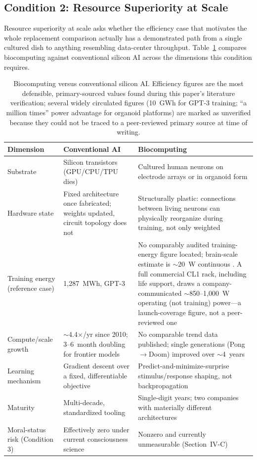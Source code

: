 \documentclass[journal]{IEEEtran}
\begin{document}
\subsection{\textcolor{ambercolor}{Condition 2: Resource Superiority at Scale}}

Resource superiority at scale asks whether the efficiency case that motivates the
whole replacement comparison actually has a demonstrated path from a single cultured
dish to anything resembling data-center throughput. Table~\ref{tab:comparison}
compares biocomputing against conventional silicon AI across the dimensions this
condition requires.

\begin{table}[!t]
\centering
\caption{Biocomputing versus conventional silicon AI. Efficiency figures are the
most defensible, primary-sourced values found during this paper's literature
verification; several widely circulated figures (10~GWh for GPT-3 training; ``a
million times'' power advantage for organoid platforms) are marked as unverified
because they could not be traced to a peer-reviewed primary source at time of
writing.}
\label{tab:comparison}
\begin{tabular}{@{}p{2.1cm}p{2.5cm}p{2.9cm}@{}}
\toprule
\textbf{Dimension} & \textbf{Conventional AI} & \textbf{Biocomputing} \\
\midrule
Substrate & Silicon transistors (GPU/CPU/TPU dies) & Cultured human neurons on
electrode arrays or in organoid form \cite{kagan2022dishbrain, jordan2024open} \\
Hardware state & Fixed architecture once fabricated; weights updated, circuit
topology does not & Structurally plastic: connections between living neurons can
physically reorganize during training, not only weighted \cite{kagan2022dishbrain} \\
Training energy (reference case) & 1{,}287~MWh, GPT-3 \cite{patterson2021carbon} &
No comparably audited training-energy figure located; brain-scale estimate is
$\sim$20~W continuous \cite{raichle2002appraising}. A full commercial CL1 rack,
including life support, draws a company-communicated
$\sim$850--1{,}000~W operating (not training) power---a launch-coverage figure,
not a peer-reviewed one \cite{thompson2025cl1launch} \\
Compute/scale growth & $\sim$4.4$\times$/yr since 2010; 3--6~month doubling for
frontier models \cite{epoch2025compute} & No comparable trend data published; single
generations (Pong$\to$Doom) improved over $\sim$4~years \cite{corticallabs2026doom} \\
Learning mechanism & Gradient descent over a fixed, differentiable objective &
Predict-and-minimize-surprise stimulus/response shaping, not backpropagation
\cite{kagan2022dishbrain} \\
Maturity & Multi-decade, standardized tooling & Single-digit years; two companies
with materially different architectures \cite{jordan2024open} \\
Moral-status risk (Condition 3) & Effectively zero under current consciousness
science & Nonzero and currently unmeasurable (Section~IV-C) \\
\bottomrule
\end{tabular}
\end{table}
\end{document}
